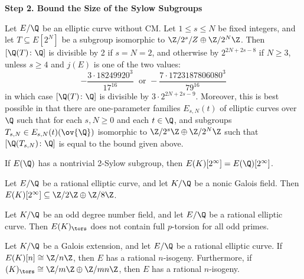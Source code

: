 \begin{frame}[plain]
\vfill
\begin{center} {\bfseries \Large \textcolor{UniOrange}{Step 2. Bound the Size of the Sylow Subgroups}} \end{center}
\vfill 
\end{frame}


\begin{frame}[plain]
\begin{thm}
Let $E/\Q$ be an elliptic curve without CM. Let $1 \leq s \leq N$ be fixed integers, and let $T \subseteq E[2^N]$ be a subgroup isomorphic to $\Z/2^s/Z \oplus \Z/2^N \Z$. Then $[\Q(T) \colon \Q]$ is divisible by 2 if $s=N=2$, and otherwise by $2^{2N+2s-8}$ if $N \geq 3$, unless $s \geq 4$ and $j(E)$ is one of the two values:
	\[
	- \dfrac{3 \cdot 18249920^3}{17^{16}}\; \text{ or } - \dfrac{7 \cdot 1723187806080^3}{79^{16}}
	\]
in which case $[\Q(T) \colon \Q]$ is divisible by $3 \cdot 2^{2N+2s-9}$. Moreover, this is best possible in that there are one-parameter families $E_{s,N}(t)$ of elliptic curves over $\Q$ such that for each $s, N \geq 0$ and each $t \in \Q$, and subgroups $T_{s,N} \in E_{s,N}(t)(\ov{\Q})$ isomorphic to $\Z/2^s\Z \oplus \Z/2^N\Z$ such that $[\Q(T_{s,N}) \colon \Q]$ is equal to the bound given above. 
\end{thm}

\begin{lem}[Najman, 2015] \small
If $E(\Q)$ has a nontrivial 2-Sylow subgroup, then $E(K)[2^\infty]= E(\Q)[2^\infty]$. 
\end{lem}
\end{frame}



\begin{frame}[plain,c]
\begin{lem}[M.]
Let $E/\Q$ be a rational elliptic curve, and let $K/\Q$ be a nonic Galois field. Then $E(K)[2^\infty] \subseteq \Z/2\Z \oplus \Z/8\Z$.
\end{lem}
\end{frame}



\begin{frame}[plain,c]
\begin{lem}
Let $K/\Q$ be an odd degree number field, and let $E/\Q$ be a rational elliptic curve. Then $E(K)_\tors$ does not contain full $p$-torsion for all odd primes.
\end{lem}

\begin{lem}
Let $K/\Q$ be a Galois extension, and let $E/\Q$ be a rational elliptic curve. If $E(K)[n] \cong \Z/n\Z$, then $E$ has a rational $n$-isogeny. Furthermore, if $(K)_\tors \cong \Z/m\Z \oplus \Z/mn\Z$, then $E$ has a rational $n$-isogeny. 
\end{lem}
\end{frame}





